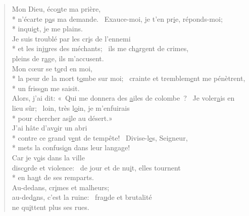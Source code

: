 
\begin{verse}
Mon Dieu, éco\underline{u}te ma prière, \\*
n’écarte p\underline{a}s ma demande.~\psalmstar
{}Exauce-moi, je t’en pr\underline{i}e, réponds-moi; \\*
inqui\underline{e}t, je me plains. \\

Je suis troublé par les cr\underline{i}s de l’ennemi \\*
et les inj\underline{u}res des méchants;~\psalmstar
ils me ch\underline{a}rgent de crimes, \\
pleins de r\underline{a}ge, ils m’accusent. \\

Mon cœur se t\underline{o}rd en moi, \\*
la peur de la mort t\underline{o}mbe sur moi;~\psalmstar
{}crainte et tremblem\underline{e}nt me pénètrent, \\*
un friss\underline{o}n me saisit. \\

Alors, j’ai dit: « Qui me donnera des \underline{a}iles de colombe ?~\psalmdagger
Je voler\underline{a}is en lieu sûr;~\psalmstar
{}loin, très l\underline{o}in, je m’enfuirais \\*
pour chercher as\underline{i}le au désert.» \\

J’ai hâte d’av\underline{o}ir un abri \\*
contre ce grand v\underline{e}nt de tempête!~\psalmstar
{}Divise-l\underline{e}s, Seigneur, \\*
mets la confusi\underline{o}n dans leur langage! \\

Car je v\underline{o}is dans la ville \\
disc\underline{o}rde et violence:~\psalmstar
{}de jour et de nu\underline{i}t, elles tournent \\*
en ha\underline{u}t de ses remparts. \\

Au-dedans, cr\underline{i}mes et malheurs; \\
au-ded\underline{a}ns, c’est la ruine:~\psalmstar
fra\underline{u}de et brutalité \\
ne qu\underline{i}ttent plus ses rues. \\


\end{verse}
